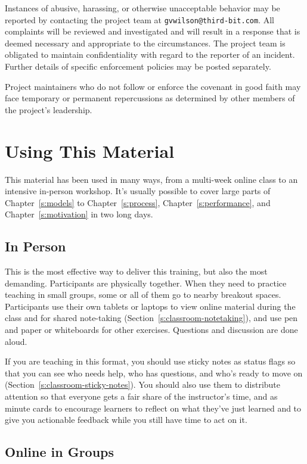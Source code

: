 Instances of abusive, harassing, or otherwise unacceptable behavior
may be reported by contacting the project team at
\texttt{gvwilson@third-bit.com}. All complaints will be
reviewed and investigated and will result in a response that is deemed
necessary and appropriate to the circumstances. The project team is
obligated to maintain confidentiality with regard to the reporter of
an incident. Further details of specific enforcement policies may be
posted separately.

Project maintainers who do not follow or enforce the covenant in good
faith may face temporary or permanent repercussions as determined by
other members of the project's leadership.

\section{Using This Material}\label{s:joining-using}

This material has been used in many ways, from a multi-week online
class to an intensive in-person workshop. It's usually possible to
cover large parts of Chapter~\ref{s:models} to Chapter~\ref{s:process},
Chapter~\ref{s:performance}, and Chapter~\ref{s:motivation} in two long
days.

\subsection*{In Person}

This is the most effective way to deliver this training, but also the
most demanding. Participants are physically together. When they need to
practice teaching in small groups, some or all of them go to nearby
breakout spaces. Participants use their own tablets or laptops to view
online material during the class and for shared note-taking
(Section~\ref{s:classroom-notetaking}), and use pen and paper or
whiteboards for other exercises. Questions and discussion are done
aloud.

If you are teaching in this format, you should use sticky notes as
status flags so that you can see who needs help, who has questions,
and who's ready to move on (Section~\ref{s:classroom-sticky-notes}). You
should also use them to distribute attention so that everyone gets a
fair share of the instructor's time, and as minute cards to encourage
learners to reflect on what they've just learned and to give you
actionable feedback while you still have time to act on it.

\subsection*{Online in Groups}


